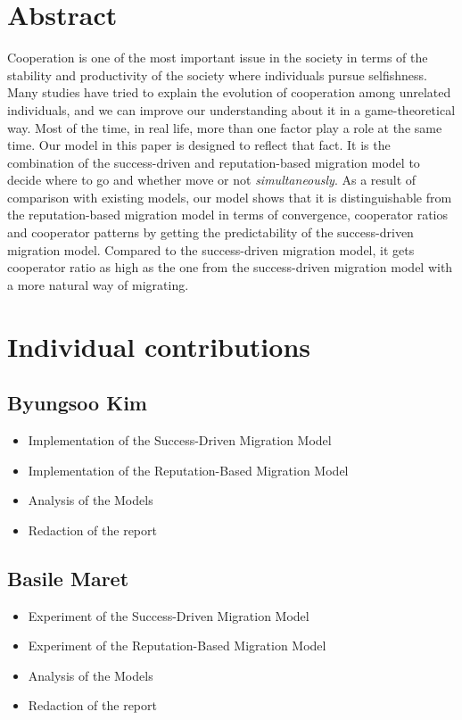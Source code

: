 \documentclass[11pt]{article}
\begin{document}
\newpage




\section{Abstract}
Cooperation is one of the most important issue in the society in terms of the stability and productivity of the society where individuals pursue selfishness. Many studies have tried to explain the evolution of cooperation among unrelated individuals, and we can improve our understanding about it in a game-theoretical way. Most of the time, in real life, more than one factor play a role at the same time. Our model in this paper is designed to reflect that fact. It is the combination of the success-driven and reputation-based migration model to decide where to go and whether move or not \textit{simultaneously}. As a result of comparison with existing models, our model shows that it is distinguishable from the reputation-based migration model in terms of convergence, cooperator ratios and cooperator patterns by getting the predictability of the success-driven migration model. Compared to the success-driven migration model, it gets cooperator ratio as high as the one from the success-driven migration model with a more natural way of migrating.

\section{Individual contributions}
\subsection{Byungsoo Kim}
\begin{itemize}
\item Implementation of the Success-Driven Migration Model
\item Implementation of the Reputation-Based Migration Model
\item Analysis of the Models
\item Redaction of the report
\end{itemize}

\subsection{Basile Maret}
\begin{itemize}
\item Experiment of the Success-Driven Migration Model
\item Experiment of the Reputation-Based Migration Model
\item Analysis of the Models
\item Redaction of the report
\end{itemize}
\end{document}
